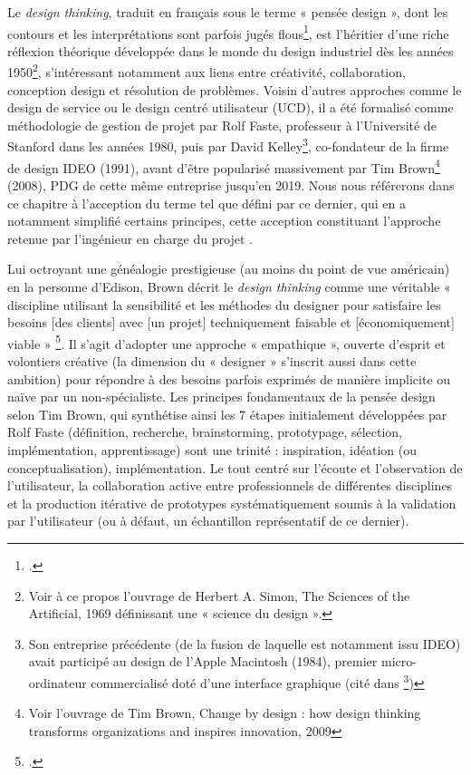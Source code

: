 Le  \textit{design thinking}, traduit en français sous le terme « pensée design », dont les contours et les interprétations sont parfois jugés flous\footcite[p.2]{kelly_design_2021}, est l’héritier d’une riche réflexion théorique développée dans le monde du design industriel dès les années 1950\footnote{Voir à ce propos l’ouvrage de Herbert A. Simon, The Sciences of the Artificial, 1969 définissant une « science du design ».}, s’intéressant notamment aux liens entre créativité, collaboration, conception design et résolution de problèmes. Voisin d’autres approches comme le design de service ou le design centré utilisateur (UCD), il a été formalisé comme méthodologie de gestion de projet par Rolf Faste, professeur à l’Université de Stanford dans les années 1980, puis par David Kelley\footnote{Son entreprise précédente (de la fusion de laquelle est notamment issu IDEO) avait participé au design de l’Apple Macintosh (1984), premier micro-ordinateur commercialisé doté d’une interface graphique (cité dans \footcite{vial_quappelle-t-_2012})}, co-fondateur de la firme de design IDEO (1991), avant d’être popularisé massivement par Tim Brown\footnote{Voir l’ouvrage de Tim Brown, Change by design : how design thinking transforms organizations and inspires innovation, 2009} (2008), PDG de cette même entreprise jusqu’en 2019. Nous nous référerons dans ce chapitre à l’acception du terme tel que défini par ce dernier, qui en a notamment simplifié certains principes, cette acception constituant l’approche retenue par l’ingénieur en charge du projet \pense. 

Lui octroyant une généalogie prestigieuse (au moins du point de vue américain) en la personne d’Edison, Brown décrit le \textit{design thinking} comme une véritable « discipline utilisant la sensibilité et les méthodes du designer pour satisfaire les besoins [des clients] avec [un projet] techniquement faisable et [économiquement] viable » \footcite[p.2]{brown_design_2008}. Il s’agit d’adopter une approche « empathique », ouverte d’esprit et volontiers créative (la dimension du « designer » s’inscrit aussi dans cette ambition) pour répondre à des besoins parfois exprimés de manière implicite ou naïve par un non-spécialiste. Les principes fondamentaux de la pensée design selon Tim Brown, qui synthétise ainsi les 7 étapes initialement développées par Rolf Faste (définition, recherche, brainstorming, prototypage, sélection, implémentation, apprentissage) sont une trinité : inspiration,  idéation (ou conceptualisation), implémentation. Le tout centré sur l’écoute et l’observation de l’utilisateur, la collaboration active entre professionnels de différentes disciplines et la production itérative de prototypes systématiquement soumis à la validation par l’utilisateur (ou à défaut, un échantillon représentatif de ce dernier). 

